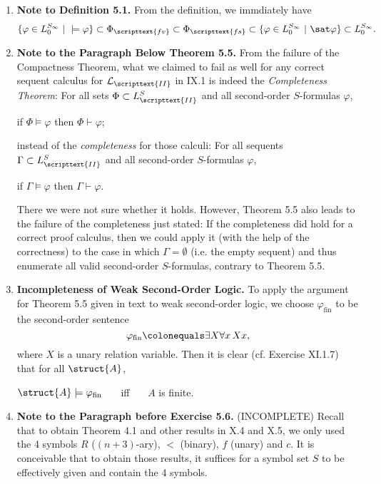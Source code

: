 \begin{enumerate}[1.]
\item \textbf{Note to Definition 5.1.} From the definition, we immdiately have
\[
\{ \varphi \in L_0^{S_\infty} \ | \ \models \varphi \} \subset \Phi_\scripttext{fv} \subset \Phi_\scripttext{fs} \subset \{ \varphi \in L_0^{S_\infty} \ | \ \sat \varphi \} \subset L_0^{S_\infty}
.
\]
%
\item \textbf{Note to the Paragraph Below Theorem 5.5.} From the failure of the Compactness Theorem, what we claimed to fail as well for any correct sequent calculus for $\mathcal{L}_\scripttext{II}$ in IX.1 is indeed the \emph{Completeness Theorem}: For all sets $\Phi \subset L^S_\scripttext{II}$ and all second-order $S$-formulas $\varphi$, 
\begin{center}
if $\Phi \models \varphi$ then $\Phi \vdash \varphi$;
\end{center}
instead of the \emph{completeness} for those calculi: For all sequents $\Gamma \subset L^S_\scripttext{II}$ and all second-order $S$-formulas $\varphi$,
\begin{center}
if $\Gamma \models \varphi$ then $\Gamma \vdash \varphi$.
\end{center}
There we were not sure whether it holds. However, Theorem 5.5 also leads to the failure of the completeness just stated: If the completeness did hold for a correct proof calculus, then we could apply it (with the help of the correctness) to the case in which $\Gamma = \emptyset$ (i.e. the empty sequent) and thus enumerate all valid second-order $S$-formulas, contrary to Theorem 5.5.
%
\item \textbf{Incompleteness of Weak Second-Order Logic.} To apply the argument for Theorem 5.5 given in text to weak second-order logic, we choose $\varphi_\mathrm{fin}$ to be the second-order sentence
\[
\varphi_\mathrm{fin} \colonequals \exists X \forall x \, Xx,
\]
where $X$ is a unary relation variable. Then it is clear (cf. Exercise XI.1.7) that for all $\struct{A}$,
\begin{center}
$\struct{A} \models \varphi_\mathrm{fin}$ \ \ \ iff \ \ \ $A$ is finite.
\end{center}
%
\item \textbf{Note to the Paragraph before Exercise 5.6.} (INCOMPLETE) Recall that to obtain Theorem 4.1 and other results in X.4 and X.5, we only used the 4 symbols $R$ ($(n + 3)$-ary), $<$ (binary), $f$ (unary) and $c$. It is conceivable that to obtain those results, it suffices for a symbol set $S$ to be effectively given and contain the 4 symbols.\\

\end{enumerate}

